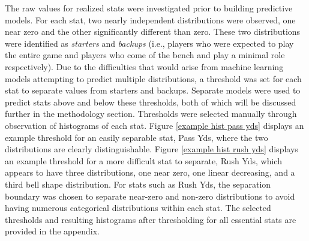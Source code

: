 \documentclass[12pt]{article}
\begin{document}
The raw values for realized stats were investigated prior to building predictive models. For each stat, two nearly independent distributions were observed, one near zero and the other significantly different than zero. These two distributions were identified as \textit{starters} and \textit{backups} (i.e., players who were expected to play the entire game and players who come of the bench and play a minimal role respectively). Due to the difficulties that would arise from machine learning models attempting to predict multiple distributions, a threshold was set for each stat to separate values from starters and backups. Separate models were used to predict stats above and below these thresholds, both of which will be discussed further in the methodology section. Thresholds were selected manually through observation of histograms of each stat. Figure \ref{example hist pass yds} displays an example threshold for an easily separable stat, Pass Yds, where the two distributions are clearly distinguishable. Figure \ref{example hist rush yds} displays an example threshold for a more difficult stat to separate, Rush Yds, which appears to have three distributions, one near zero, one linear decreasing, and a third bell shape distribution. For stats such as Rush Yds, the separation boundary was chosen to separate near-zero and non-zero distributions to avoid having numerous categorical distributions within each stat. The selected thresholds and resulting histograms after thresholding for all essential stats are provided in the appendix.
\end{document}
